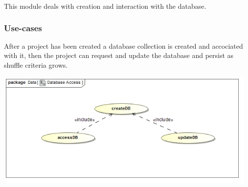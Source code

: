 This module deals with creation and interaction with the database.

\subsubsection{Use-cases}
After a project has been created a database collection is created and accociated with it, then the project can request and update the database and persist as shuffle criteria grows.\par
\includegraphics[width=13cm]{./graphics/databaseAccessUseCase.jpg}
    \rule{0\linewidth}{0.15\linewidth}\par
{}